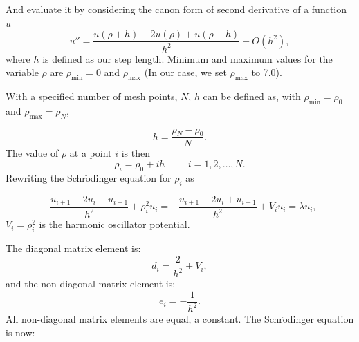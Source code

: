 \documentclass[%
reprint,
superscriptaddress,
showpacs,
nofootinbib,
bibnotes,amsmath,amssymb,aps,
prc, 
]{revtex4-1}
\begin{document}
And evaluate it by considering the canon form of second derivative of a function $u$
\begin{equation}
u''=\frac{u(\rho+h) -2u(\rho) +u(\rho-h)}{h^2} +O(h^2),
\label{eq:diffoperation}
\end{equation}
where $h$ is defined as our step length.
Minimum and maximum values for the variable $\rho$ are
$\rho_{\mathrm{min}}=0$  and $\rho_{\mathrm{max}}$
(In our case, we set $\rho_{\mathrm{max}}$ to 7.0).

With a specified number of mesh points, $N$, 
$h$ can be defined as, with $\rho_{\mathrm{min}}=\rho_0$  and $\rho_{\mathrm{max}}=\rho_N$,

\begin{equation*}
h=\frac{\rho_N-\rho_0 }{N}.
\end{equation*}
The value of $\rho$ at a point $i$ is then 
\[
\rho_i= \rho_0 + ih \hspace{1cm} i=1,2,\dots , N.
\]
Rewriting the Schr$\ddot{\textrm{o}}$dinger equation for $\rho_i$ as

\[
-\frac{u_{i+1} -2u_i +u_{i-1}}{h^2}+\rho_i^2u_i=-\frac{u_{i+1} -2u_i +u_{i-1} }{h^2}+V_iu_i  = \lambda u_i,
\]
$V_i=\rho_i^2$ is the harmonic oscillator potential.

The diagonal matrix element is:
\begin{equation*}
d_i=\frac{2}{h^2}+V_i,
\end{equation*}
and the non-diagonal matrix element is:
\begin{equation*}
e_i=-\frac{1}{h^2}.
\end{equation*}
All non-diagonal matrix elements are equal, a constant.
The Schr$\ddot{\textrm{o}}$dinger equation is now:
\end{document}
